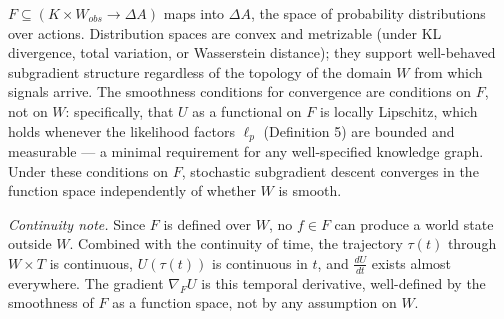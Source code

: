\documentclass[
]{article}
\begin{document}
\(F \subseteq (K \times W_{obs} \to \Delta A)\) maps into \(\Delta A\),
the space of probability distributions over actions. Distribution spaces
are convex and metrizable (under KL divergence, total variation, or
Wasserstein distance); they support well-behaved subgradient structure
regardless of the topology of the domain \(W\) from which signals
arrive. The smoothness conditions for convergence are conditions on
\(F\), not on \(W\): specifically, that \(U\) as a functional on \(F\)
is locally Lipschitz, which holds whenever the likelihood factors
\(\ell_p\) (Definition 5) are bounded and measurable --- a minimal
requirement for any well-specified knowledge graph. Under these
conditions on \(F\), stochastic subgradient descent converges in the
function space independently of whether \(W\) is smooth.

\emph{Continuity note.} Since \(F\) is defined over \(W\), no
\(f \in F\) can produce a world state outside \(W\). Combined with the
continuity of time, the trajectory \(\tau(t)\) through \(W \times T\) is
continuous, \(U(\tau(t))\) is continuous in \(t\), and \(\frac{dU}{dt}\)
exists almost everywhere. The gradient \(\nabla_F U\) is this temporal
derivative, well-defined by the smoothness of \(F\) as a function space,
not by any assumption on \(W\).
\end{document}

